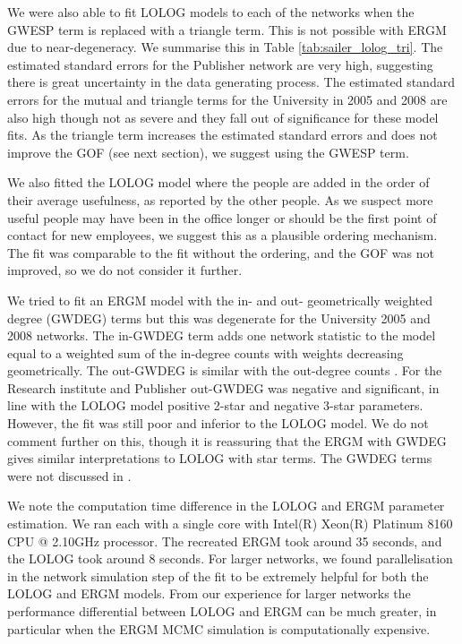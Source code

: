 \documentclass[
]{statsoc}
\begin{document}
We were also able to fit LOLOG models to each of the networks when the
GWESP term is replaced with a triangle term. This is not possible with
ERGM due to near-degeneracy. We summarise this in Table
\ref{tab:sailer_lolog_tri}. The estimated standard errors for the
Publisher network are very high, suggesting there is great uncertainty
in the data generating process. The estimated standard errors for the
mutual and triangle terms for the University in 2005 and 2008 are also
high though not as severe and they fall out of significance for these
model fits. As the triangle term increases the estimated standard errors
and does not improve the GOF (see next section), we suggest using the
GWESP term.

We also fitted the LOLOG model where the people are added in the order
of their average usefulness, as reported by the other people. As we
suspect more useful people may have been in the office longer or should
be the first point of contact for new employees, we suggest this as a
plausible ordering mechanism. The fit was comparable to the fit without
the ordering, and the GOF was not improved, so we do not consider it
further.

We tried to fit an ERGM model with the in- and out- geometrically
weighted degree (GWDEG) terms but this was degenerate for the University
2005 and 2008 networks. The in-GWDEG term adds one network statistic to
the model equal to a weighted sum of the in-degree counts with weights
decreasing geometrically. The out-GWDEG is similar with the out-degree
counts \citep[See][for a detailed explanation]{hunter07}. For the
Research institute and Publisher out-GWDEG was negative and significant,
in line with the LOLOG model positive 2-star and negative 3-star
parameters. However, the fit was still poor and inferior to the LOLOG
model. We do not comment further on this, though it is reassuring that
the ERGM with GWDEG gives similar interpretations to LOLOG with star
terms. The GWDEG terms were not discussed in \cite{Sailer2012}.

We note the computation time difference in the LOLOG and ERGM parameter
estimation. We ran each with a single core with Intel(R) Xeon(R)
Platinum 8160 CPU @ 2.10GHz processor. The recreated ERGM took around 35
seconds, and the LOLOG took around 8 seconds. For larger networks, we
found parallelisation in the network simulation step of the fit to be
extremely helpful for both the LOLOG and ERGM models. From our
experience for larger networks the performance differential between
LOLOG and ERGM can be much greater, in particular when the ERGM MCMC
simulation is computationally expensive.
\end{document}

